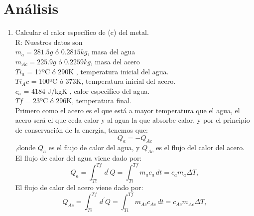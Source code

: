 \documentclass[a4paper, 12p]{article}
\begin{document}
\section{Análisis}
\begin{enumerate}
      \item Calcular el calor específico de (c) del metal.\\
      R: Nuestros datos son\\ 
                     $m_{a} = 281.5 g$ ó $0.2815 kg$, masa del agua \\
                     $m_{Ac} = 225.9 g$ ó $0.2259 kg$, masa del acero\\
                     $Ti_a$ = 17ºC ó 290K , temperatura inicial del agua. \\
                     $Ti_Ac$ = 100ºC ó 373K, temperatura inicial del acero. \\ 
                     $c_{a}$ = 4184 J/kgK , calor especifíco del agua. \cite{agua}\\
                     $Tf$ = 23ºC ó 296K, temperatura final.\\ 
                     
                     Primero como el acero es el que está a mayor temperatura que el agua, el acero será el que ceda calor y al agua la que absorbe calor, y por el principio de conservación de la energía, tenemos que:\\
                     \begin{equation}\label{eq1}
                     Q_{a} = -Q_{Ac} 
                     \end{equation}
                     ,donde $ Q_{a}$ es el flujo de calor del agua, y $Q_{Ac}$ es el flujo del calor del acero.\\ 
                     
                     El flujo de calor del agua viene dado por:
                     \begin{equation}\label{eq2}
                     Q_{a} = \int_{Ti}^{Tf} \! \, d^{\prime}Q  = \int_{Ti}^{Tf} \! m_{a}c_{a} \, dt = c_{a} m_{a} \Delta T,
                     \end{equation}
                     El flujo de calor del acero viene dado por:
                     \begin{equation}\label{eq3}		       
                     Q_{Ac} = \int_{Ti}^{Tf} \! \, d^{\prime}Q  = \int_{Ti}^{Tf} \! m_{Ac}c_{Ac} \, dt = c_{Ac} m_{Ac} \Delta T,
                     \end{equation}
                    

\end{enumerate}
\end{document}
